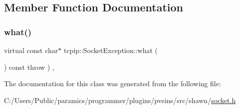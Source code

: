 \subsection{Member Function Documentation}
\mbox{\label{classtcpip_1_1_socket_exception_a37ca5e1050f6a8e1ee97f400945405cb}} 
\subsubsection{\texorpdfstring{what()}{what()}}
{\footnotesize\ttfamily virtual const char$\ast$ tcpip\+::\+Socket\+Exception\+::what (\begin{DoxyParamCaption}{ }\end{DoxyParamCaption}) const throw  ) \hspace{0.3cm}{\ttfamily [inline]}, {\ttfamily [virtual]}}



The documentation for this class was generated from the following file\+:\begin{DoxyCompactItemize}
\item 
C\+:/\+Users/\+Public/paramics/programmer/plugins/pveins/src/shawn/\hyperlink{socket_8h}{socket.\+h}\end{DoxyCompactItemize}

